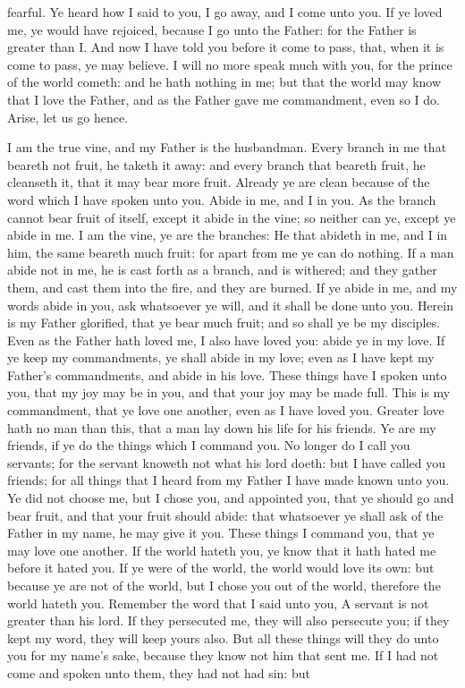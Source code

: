 fearful. Ye heard how I said to you, I go away, and I come unto you. If ye loved me, ye would have rejoiced, because I go unto the Father: for the Father is greater than I. And now I have told you before it come to pass, that, when it is come to pass, ye may believe. I will no more speak much with you, for the prince of the world cometh: and he hath nothing in me; but that the world may know that I love the Father, and as the Father gave me commandment, even so I do. Arise, let us go hence. 

I am the true vine, and my Father is the husbandman. Every branch in me that beareth not fruit, he taketh it away: and every branch that beareth fruit, he cleanseth it, that it may bear more fruit. Already ye are clean because of the word which I have spoken unto you. Abide in me, and I in you. As the branch cannot bear fruit of itself, except it abide in the vine; so neither can ye, except ye abide in me. I am the vine, ye are the branches: He that abideth in me, and I in him, the same beareth much fruit: for apart from me ye can do nothing. If a man abide not in me, he is cast forth as a branch, and is withered; and they gather them, and cast them into the fire, and they are burned. If ye abide in me, and my words abide in you, ask whatsoever ye will, and it shall be done unto you. Herein is my Father glorified, that ye bear much fruit; and so shall ye be my disciples. Even as the Father hath loved me, I also have loved you: abide ye in my love. If ye keep my commandments, ye shall abide in my love; even as I have kept my Father’s commandments, and abide in his love. These things have I spoken unto you, that my joy may be in you, and that your joy may be made full. This is my commandment, that ye love one another, even as I have loved you. Greater love hath no man than this, that a man lay down his life for his friends. Ye are my friends, if ye do the things which I command you. No longer do I call you servants; for the servant knoweth not what his lord doeth: but I have called you friends; for all things that I heard from my Father I have made known unto you. Ye did not choose me, but I chose you, and appointed you, that ye should go and bear fruit, and that your fruit should abide: that whatsoever ye shall ask of the Father in my name, he may give it you. These things I command you, that ye may love one another. If the world hateth you, ye know that it hath hated me before it hated you. If ye were of the world, the world would love its own: but because ye are not of the world, but I chose you out of the world, therefore the world hateth you. Remember the word that I said unto you, A servant is not greater than his lord. If they persecuted me, they will also persecute you; if they kept my word, they will keep yours also. But all these things will they do unto you for my name’s sake, because they know not him that sent me. If I had not come and spoken unto them, they had not had sin: but 